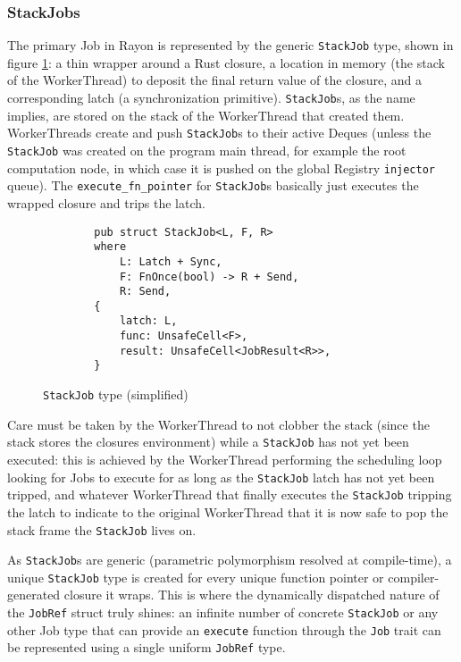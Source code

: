 \documentclass[bsc,frontabs,singlespacing,parskip,deptreport,normalheadings]{infthesis}
\begin{document}
\subsubsection*{StackJobs}

The primary Job in Rayon is represented by the generic \texttt{StackJob} type,
shown in figure \ref{fig:stackjob}: a thin wrapper around a Rust closure, a
location in memory (the stack of the WorkerThread) to deposit the final return
value of the closure, and a corresponding latch (a synchronization primitive).
\texttt{StackJob}s, as the name implies, are stored on the stack of the
WorkerThread that created them. WorkerThreads create and push \texttt{StackJob}s
to their active Deques (unless the \texttt{StackJob} was created on the program
main thread, for example the root computation node, in which case it is pushed
on the global Registry \texttt{injector} queue). The
\texttt{execute\_fn\_pointer} for \texttt{StackJob}s basically just executes the
wrapped closure and trips the latch.

\begin{figure}[ht]
    \begin{verbatim}
        pub struct StackJob<L, F, R>
        where
            L: Latch + Sync,
            F: FnOnce(bool) -> R + Send,
            R: Send,
        {
            latch: L,
            func: UnsafeCell<F>,
            result: UnsafeCell<JobResult<R>>,
        }
    \end{verbatim}
    \caption{\texttt{StackJob} type (simplified)}
    \label{fig:stackjob}
\end{figure}

Care must be taken by the WorkerThread to not clobber the stack (since the stack
stores the closures environment) while a \texttt{StackJob} has not yet been
executed: this is achieved by the WorkerThread performing the scheduling loop
looking for Jobs to execute for as long as the \texttt{StackJob} latch has not
yet been tripped, and whatever WorkerThread that finally executes the
\texttt{StackJob} tripping the latch to indicate to the original WorkerThread
that it is now safe to pop the stack frame the \texttt{StackJob} lives on.

As \texttt{StackJob}s are generic (parametric polymorphism resolved at
compile-time), a unique \texttt{StackJob} type is created for every unique
function pointer or compiler-generated closure it wraps. This is where the
dynamically dispatched nature of the \texttt{JobRef} struct truly shines: an
infinite number of concrete \texttt{StackJob} or any other Job type that can
provide an \texttt{execute} function through the \texttt{Job} trait can be
represented using a single uniform \texttt{JobRef} type.
\end{document}

